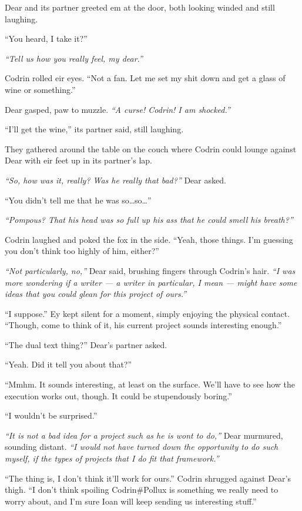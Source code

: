 Dear and its partner greeted em at the door, both looking winded and still laughing.

``You heard, I take it?''

\emph{``Tell us how you really feel, my dear.''}

Codrin rolled eir eyes. ``Not a fan. Let me set my shit down and get a glass of wine or something.''

Dear gasped, paw to muzzle. \emph{``A curse! Codrin! I am shocked.''}

``I'll get the wine,'' its partner said, still laughing.

They gathered around the table on the couch where Codrin could lounge against Dear with eir feet up in its partner's lap.

\emph{``So, how was it, really? Was he really that bad?''} Dear asked.

``You didn't tell me that he was so\ldots so\ldots{}''

\emph{``Pompous? That his head was so full up his ass that he could smell his breath?''}

Codrin laughed and poked the fox in the side. ``Yeah, those things. I'm guessing you don't think too highly of him, either?''

\emph{``Not particularly, no,''} Dear said, brushing fingers through Codrin's hair. \emph{``I was more wondering if a writer — a writer in particular, I mean — might have some ideas that you could glean for this project of ours.''}

``I suppose.'' Ey kept silent for a moment, simply enjoying the physical contact. ``Though, come to think of it, his current project sounds interesting enough.''

``The dual text thing?'' Dear's partner asked.

``Yeah. Did it tell you about that?''

``Mmhm. It sounds interesting, at least on the surface. We'll have to see how the execution works out, though. It could be stupendously boring.''

``I wouldn't be surprised.''

\emph{``It is not a bad idea for a project such as he is wont to do,''} Dear murmured, sounding distant. \emph{``I would not have turned down the opportunity to do such myself, if the types of projects that I do fit that framework.''}

``The thing is, I don't think it'll work for ours.'' Codrin shrugged against Dear's thigh. ``I don't think spoiling Codrin\#Pollux is something we really need to worry about, and I'm sure Ioan will keep sending us interesting stuff.''

